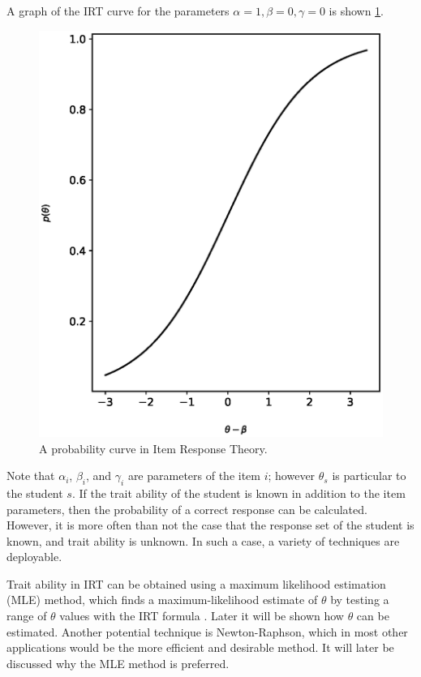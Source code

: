 A graph of the IRT curve for the parameters $\alpha=1, \beta=0, \gamma=0$ is
shown \ref{fig:irt}.

\begin{figure}[p!]
 \label{fig:irt}
 \includegraphics{fig/irt.eps} 
 \caption{A probability curve in Item Response Theory.}
\end{figure}

Note that $\alpha_i$, $\beta_i$, and $\gamma_i$ are parameters of the item $i$;
however $\theta_s$ is particular to the student $s$.  If the trait ability of
the student is known in addition to the item parameters, then the probability
of a correct response can be calculated.  However, it is more often than not
the case that the response set of the student is known, and trait ability is
unknown.  In such a case, a variety of techniques are deployable.

Trait ability in IRT can be obtained using a maximum likelihood estimation
(MLE) method, which finds a maximum-likelihood estimate of $\theta$ by testing
a range of $\theta$ values with the IRT formula \cite{baker2004}.  Later it
will be shown how $\theta$ can be estimated.  Another potential technique is
Newton-Raphson, which in most other applications would be the more efficient
and desirable method.  It will later be discussed why the MLE method is
preferred.

